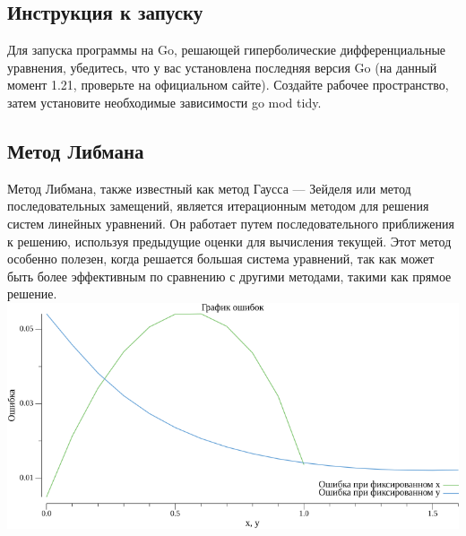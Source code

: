 \documentclass{article}
\begin{document}
\subsection*{Инструкция к запуску}
Для запуска программы на Go, решающей гиперболические дифференциальные уравнения, убедитесь, что у вас установлена последняя версия Go 
(на данный момент 1.21, проверьте на официальном сайте). Создайте рабочее пространство, затем установите необходимые зависимости go mod tidy.

\pagebreak

\subsection*{Метод Либмана}

Метод Либмана, также известный как метод Гаусса — Зейделя или метод последовательных замещений, является итерационным методом для решения систем 
линейных уравнений. Он работает путем последовательного приближения к решению, используя предыдущие оценки для вычисления текущей. Этот метод особенно 
полезен, когда решается большая система уравнений, так как может быть более эффективным по сравнению с другими методами, такими как прямое решение.
\\
\includegraphics[scale=0.6]{error_plot_0.png}
\\
\end{document}
